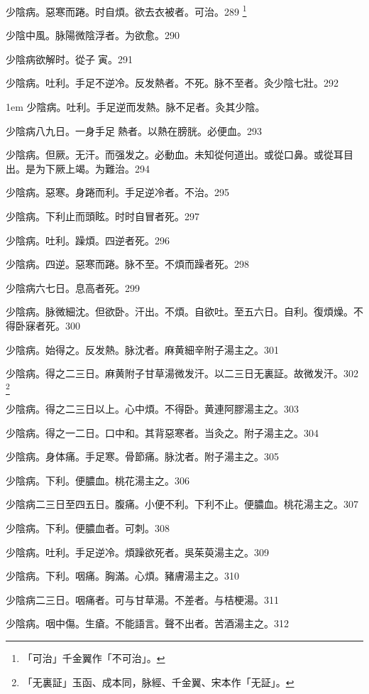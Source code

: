 少陰病。惡寒而踡。时自煩。欲去衣被者。可治。289
	\footnote{「可治」千金翼作「不可治」。}

少陰中風。脉陽微陰浮者。为欲愈。290

少陰病欲解时。從子{\sungtpii 𥁞}寅。291

少陰病。吐利。手足不逆{\khaaitp 冷}。反发熱者。不死。脉不至者。灸少陰七壯。292

\hangindent 1em
少陰病。吐利。手足逆而发熱。脉不足者。灸其少陰。{\gaoben}

少陰病八九日。一身手足{\sungtpii 𥁞}熱者。以熱在膀胱。必便血。293

少陰病。但厥。无汗。而强发之。必動血。未知從何道出。或從口鼻。或從{\khaaitp 耳}目出。是为下厥上竭。为難治。294

少陰病。惡寒。身踡而利。手足逆{\khaaitp 冷}者。不治。295

少陰病。下利止而頭眩。时时自冒者死。297

少陰病。吐利。躁煩。四逆者死。296

少陰病。四逆。惡寒而踡。脉不至。不煩而躁者死。298

少陰病六七日。息高者死。299

少陰病。脉微細沈。但欲卧。汗出。不煩。自欲吐。{\khaaitp 至}五六日。自利。復煩燥。不得卧寐者死。300

少陰病。始得之。反发熱。脉沈者。麻黄細辛附子湯主之。301

少陰病。得之二三日。麻黄附子甘草湯微发汗。以二三日无{\khaaitp 裏}証。故微发汗。302
	\footnote{「无裏証」玉函、成本同，脉經、千金翼、宋本作「无証」。}

少陰病。得之二三日以上。心中煩。不得卧。黄連阿膠湯主之。303

少陰病。得之一二日。口中和。其背惡寒者。当灸之。附子湯主之。304

少陰病。身体痛。手足寒。骨節痛。脉沈者。附子湯主之。305

少陰病。下利。便膿血。桃花湯主之。306

少陰病二三日至四五日。腹痛。小便不利。下利不止。便膿血。桃花湯主之。307

少陰病。下利。便膿血者。可刺。308

少陰病。吐利。手足逆{\khaaitp 冷}。煩躁欲死者。{\khaaitp 吳}茱萸湯主之。309

少陰病。下利。咽痛。胸滿。心煩。豬膚湯主之。310

少陰病二三日。咽痛者。可与甘草湯。不差者。与桔梗湯。311

少陰病。咽中傷。生瘡。不能語言。聲不出者。苦酒湯主之。312

